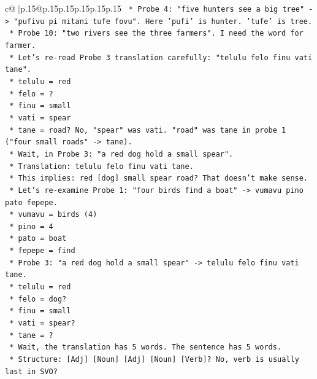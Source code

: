 \documentclass{article}
\begin{document}
{\begin{supertabular}{c@{$\;$}|p{.15\linewidth}@{}p{.15\linewidth}p{.15\linewidth}p{.15\linewidth}p{.15\linewidth}p{.15\linewidth}}
{{{\texttt{        *   Probe 4: "five hunters see a big tree" {-}> "pufivu pi mitani tufe fovu". Here 'pufi' is hunter. 'tufe' is tree.} \\
\texttt{        *   Probe 10: "two rivers see the three farmers". I need the word for farmer.} \\
\texttt{        *   Let's re{-}read Probe 3 translation carefully: "telulu felo finu vati tane".} \\
\texttt{            *   telulu = red} \\
\texttt{            *   felo = ?} \\
\texttt{            *   finu = small} \\
\texttt{            *   vati = spear} \\
\texttt{            *   tane = road? No, "spear" was vati. "road" was tane in probe 1 ("four small roads" {-}> tane).} \\
\texttt{            *   Wait, in Probe 3: "a red dog hold a small spear".} \\
\texttt{            *   Translation: telulu felo finu vati tane.} \\
\texttt{            *   This implies: red {[}dog{]} small spear road? That doesn't make sense.} \\
\texttt{            *   Let's re{-}examine Probe 1: "four birds find a boat" {-}> vumavu pino pato fepepe.} \\
\texttt{                *   vumavu = birds (4)} \\
\texttt{                *   pino = 4} \\
\texttt{                *   pato = boat} \\
\texttt{                *   fepepe = find} \\
\texttt{            *   Probe 3: "a red dog hold a small spear" {-}> telulu felo finu vati tane.} \\
\texttt{                *   telulu = red} \\
\texttt{                *   felo = dog?} \\
\texttt{                *   finu = small} \\
\texttt{                *   vati = spear?} \\
\texttt{                *   tane = ?} \\
\texttt{                *   Wait, the translation has 5 words. The sentence has 5 words.} \\
\texttt{                *   Structure: {[}Adj{]} {[}Noun{]} {[}Adj{]} {[}Noun{]} {[}Verb{]}? No, verb is usually last in SVO?} \\
}}}
\end{supertabular}}
\end{document}
